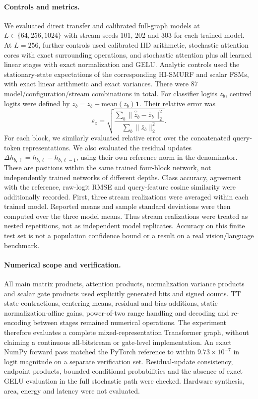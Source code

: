 \paragraph{Controls and metrics.}
We evaluated direct transfer and calibrated full-graph models at
$L\in\{64,256,1024\}$ with stream seeds 101, 202 and 303 for each trained
model. At $L=256$, further controls used calibrated IID arithmetic, stochastic
attention cores with exact surrounding operations, and stochastic attention
plus all learned linear stages with exact normalization and GELU.
Analytic controls used the stationary-state expectations of the corresponding
HI-SMURF and scalar FSMs, with exact linear arithmetic and exact variances.
There were 87 model/configuration/stream combinations in total.
For classifier logits $z_b$, centred logits were defined by
$\bar z_b=z_b-\mathrm{mean}(z_b)\mathbf{1}$. Their relative error was
\begin{equation}
\varepsilon_z=
\sqrt{\frac{\sum_b\|\widehat{\bar z}_b-\bar z_b\|_2^2}
{\sum_b\|\bar z_b\|_2^2}}.
\end{equation}
For each block, we similarly evaluated relative error over the concatenated
query-token representations. We also evaluated the residual updates
$\Delta h_{b,\ell}=h_{b,\ell}-h_{b,\ell-1}$, using their own reference norm
in the denominator. These are positions within the same trained four-block
network, not independently trained networks of different depths.
Class accuracy, agreement with the reference, raw-logit RMSE and query-feature
cosine similarity were additionally recorded. First, three stream realizations
were averaged within each trained model. Reported means and sample standard
deviations were then computed over the three model means. Thus stream
realizations were treated as nested repetitions, not as independent model
replicates. Accuracy on this finite test set is not a population confidence
bound or a result on a real vision/language benchmark.

\paragraph{Numerical scope and verification.}
All main matrix products, attention products, normalization variance products
and scalar gate products used explicitly generated bits and signed counts.
TT state contractions, centering means, residual and bias additions, static
normalization-affine gains, power-of-two range handling and decoding and
re-encoding between stages remained numerical operations. The experiment
therefore evaluates a complete mixed-representation Transformer graph, without
claiming a continuous all-bitstream or gate-level implementation. An exact
NumPy forward pass matched the PyTorch reference to within $9.73\times10^{-7}$
in logit magnitude on a separate verification set. Residual-update consistency,
endpoint products, bounded conditional probabilities and the absence of exact
GELU evaluation in the full stochastic path were checked. Hardware synthesis,
area, energy and latency were not evaluated.
